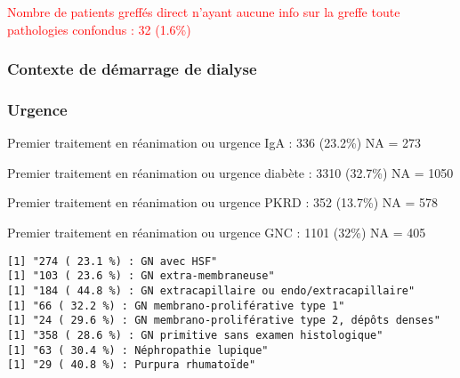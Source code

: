 \documentclass[11pt,a4paper]{article}\usepackage[]{graphicx}\usepackage[]{color}
\makeatletter
\newenvironment{kframe}{%
 \def\at@end@of@kframe{}%
 \ifinner\ifhmode%
  \def\at@end@of@kframe{\end{minipage}}%
  \begin{minipage}{\columnwidth}%
 \fi\fi%
 \def\FrameCommand##1{\hskip\@totalleftmargin \hskip-\fboxsep
 \colorbox{shadecolor}{##1}\hskip-\fboxsep
     \hskip-\linewidth \hskip-\@totalleftmargin \hskip\columnwidth}%
 \MakeFramed {\advance\hsize-\width
   \@totalleftmargin\z@ \linewidth\hsize
   \@setminipage}}%
 {\par\unskip\endMakeFramed%
 \at@end@of@kframe}
\newenvironment{knitrout}{}{} %
\makeatother
\begin{document}
\textcolor{red}{Nombre de patients greffés direct n'ayant aucune info sur la greffe toute pathologies confondus : 32 (1.6\%)}
~\\







    \subsubsection{Contexte de démarrage de dialyse}

  \subsubsection*{Urgence}


    
Premier traitement en réanimation ou urgence IgA :  336 (23.2\%) NA = 273

Premier traitement en réanimation ou urgence diabète :  3310 (32.7\%) NA = 1050

Premier traitement en réanimation ou urgence PKRD :  352 (13.7\%) NA = 578

Premier traitement en réanimation ou urgence GNC :  1101 (32\%) NA = 405

\begin{knitrout}
\color{fgcolor}\begin{kframe}
\begin{verbatim}
[1] "274 ( 23.1 %) : GN avec HSF"
[1] "103 ( 23.6 %) : GN extra-membraneuse"
[1] "184 ( 44.8 %) : GN extracapillaire ou endo/extracapillaire"
[1] "66 ( 32.2 %) : GN membrano-proliférative type 1"
[1] "24 ( 29.6 %) : GN membrano-proliférative type 2, dépôts denses"
[1] "358 ( 28.6 %) : GN primitive sans examen histologique"
[1] "63 ( 30.4 %) : Néphropathie lupique"
[1] "29 ( 40.8 %) : Purpura rhumatoïde"
\end{verbatim}
\end{kframe}
\end{knitrout}
\end{document}
